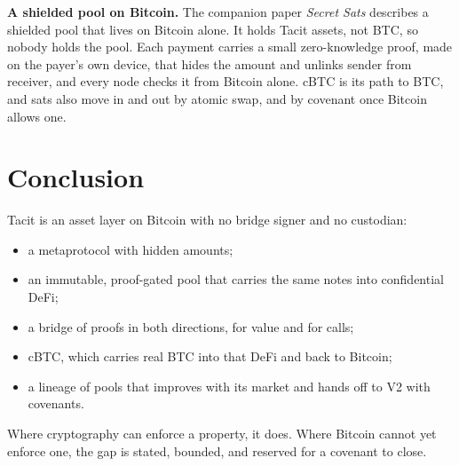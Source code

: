 \documentclass[11pt,letterpaper]{article}
\begin{document}
\textbf{A shielded pool on Bitcoin.} The companion paper \emph{Secret Sats} describes a shielded pool that lives on
Bitcoin alone. It holds Tacit assets, not BTC, so nobody holds the pool. Each payment carries a small
zero-knowledge proof, made on the payer's own device, that hides the amount and unlinks sender from
receiver, and every node checks it from Bitcoin alone. cBTC is its path to BTC, and sats also move in and
out by atomic swap, and by covenant once Bitcoin allows one.

\section{Conclusion}

Tacit is an asset layer on Bitcoin with no bridge signer and no custodian:

\begin{itemize}
\item a metaprotocol with hidden amounts;
\item an immutable, proof-gated pool that carries the same notes into confidential DeFi;
\item a bridge of proofs in both directions, for value and for calls;
\item cBTC, which carries real BTC into that DeFi and back to Bitcoin;
\item a lineage of pools that improves with its market and hands off to V2 with covenants.
\end{itemize}

Where cryptography can enforce a property, it does. Where Bitcoin cannot yet enforce one, the gap is
stated, bounded, and reserved for a covenant to close.
\end{document}
